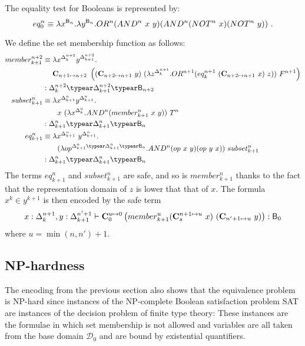 The equality test for Booleans is represented by:
$$ eq_0^n \equiv \lambda x^{\booltype_n} .\lambda y^{\booltype_n}. OR^n (AND^n~x~y) (AND^n (NOT^n~x)(NOT^n~y)) \ .$$

We define the set membership function as follows:
\begin{align*}
  member_{k+1}^{n+2} &\equiv \lambda x^{\Delta_k^{n+2}} y^{\Delta_{k+1}^{n+2}}. \\
& \quad\ \mathbf{C}_{n+1\mapsto n+2}~ \left( (\mathbf{C}_{n+2\mapsto n+1}~y)~(\lambda z^{\Delta_k^{n+1}} . OR^{n+1} (eq_k^{n+1}~(\mathbf{C}_{n+2\mapsto n+1}~x)~z))~F^{n+1}\right)\\
  & : \Delta_k^{n+2} \typear \Delta_{k+1}^{n+2} \typear \booltype_{n+2}
\\
  subset_{k+1}^n &\equiv \lambda x^{\Delta_{k+1}^n} y^{\Delta_{k+1}^n}. \\
  & \qquad x~(\lambda x^{\Delta_k^n} . AND^n (member_{k+1}^n~x~y))~T^n \\
  & : \Delta_{k+1}^n \typear \Delta_{k+1}^n \typear\booltype_n
\\
  eq_{k+1}^n &\equiv \lambda x^{\Delta_{k+1}^n}~ y^{\Delta_{k+1}^n}. \\
   & \qquad
   (\lambda op^{\Delta_{k+1}^n\typear\Delta_{k+1}^n\typear\booltype_n}. AND^n (op~x~y)(op~y~x))~subset_{k+1}^n \\
  & : \Delta_{k+1}^n \typear \Delta_{k+1}^n \typear \booltype_n
\end{align*}
The terms $eq_{k+1}^n$ and $subset_{k+1}^n$ are safe, and so is $member_{k+1}^n$ thanks to the fact that the representation domain of $z$ is lower that that of $x$. The formula $x^k\in y^{k+1}$ is then encoded by the safe term
$$x:\Delta_k^{n+1}, y:\Delta_{k+1}^{n'+1}\vdash \mathbf{C}_0^{u\mapsto  0}  \left(member_{k+1}^{u} (\mathbf{C}_s^{n+1\mapsto u}~x)~(\mathbf{C}_{n'+1\mapsto  u} ~y)\right) : \mathsf{B}_0$$
where $u = \min(n,n') +1$.



\subsection{NP-hardness}
The encoding from the previous section also shows that the equivalence problem is NP-hard since instances of the NP-complete Boolean satisfaction problem SAT are instances of the decision problem of finite type theory: These instances are the formulae in which set membership is not allowed and variables are all taken from the base domain $\mathcal{D}_0$ and are bound by existential quantifiers.


